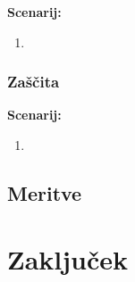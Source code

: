 \documentclass[a4paper,12pt,openright]{book}
\begin{document}
\textbf{Scenarij:}
\begin{enumerate}
	\item 
\end{enumerate}

\subsection{Zaščita}

\textbf{Scenarij:}
\begin{enumerate}
	\item 
\end{enumerate}

\section{Meritve}

\chapter{Zaključek}


\printbibliography[heading=bibintoc,title={Literatura}]
\end{document}

